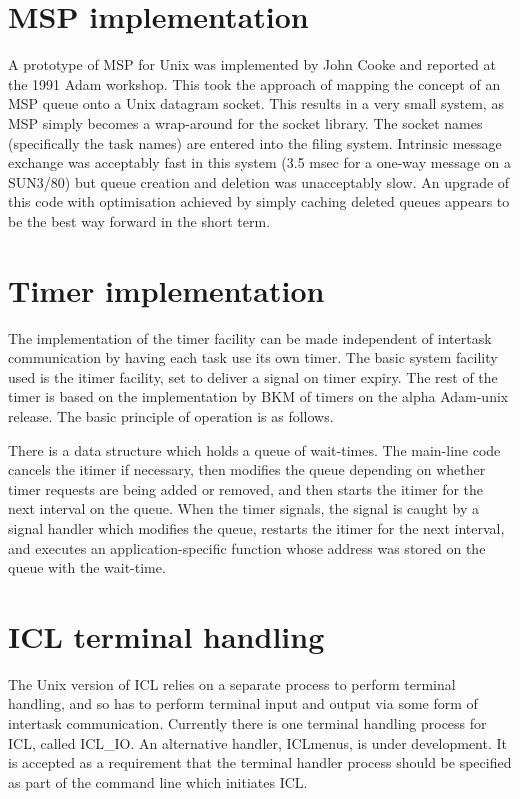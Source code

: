 \section {MSP implementation}

A prototype of MSP for Unix was implemented by John Cooke and reported
at the 1991 Adam workshop. This took the approach of mapping the concept 
of an MSP queue onto a Unix datagram socket. This results in a very 
small system, as MSP simply becomes a wrap-around for the socket 
library. The socket names (specifically the task names) are entered into 
the filing system. Intrinsic message exchange was acceptably fast in 
this system (3.5 msec for a one-way message on a SUN3/80) but queue 
creation and deletion was unacceptably slow. An upgrade of this code 
with optimisation achieved by simply caching deleted queues appears to 
be the best way forward in the short term.


\section {Timer implementation}

The implementation of the timer facility can be made independent of 
intertask communication by having each task use its own timer. The basic 
system facility used is the itimer facility, set to deliver a signal on 
timer expiry. The rest of the timer is based on the implementation by 
BKM of timers on the alpha Adam-unix release. The basic principle of 
operation is as follows.

There is a data structure which holds a queue of wait-times. The
main-line code cancels the itimer if necessary, then modifies the queue
depending on whether timer requests are being added or removed, and then
starts the itimer for the next interval on the queue. When the timer
signals, the signal is caught by a signal handler which modifies the
queue, restarts the itimer for the next interval, and executes an
application-specific function whose address was stored on the queue with
the wait-time. 


\section {ICL terminal handling}

The Unix version of ICL relies on a separate process to perform terminal 
handling, and so has to perform terminal input and output via some form 
of intertask communication. Currently there is one terminal handling 
process for ICL, called ICL\_IO. An alternative handler, ICLmenus, is 
under development. It is accepted as a requirement that the terminal 
handler process should be specified as part of the command line which 
initiates ICL.

